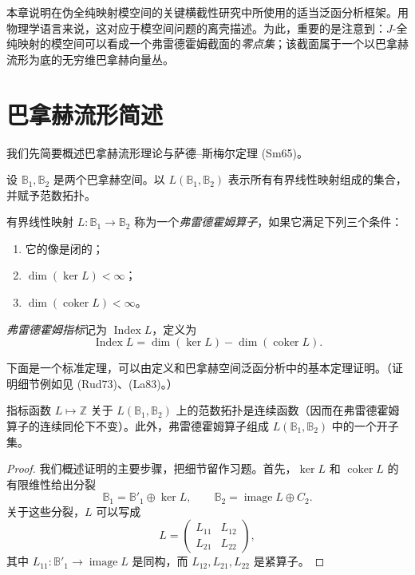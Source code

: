本章说明在伪全纯映射模空间的关键横截性研究中所使用的适当泛函分析框架。用物理学语言来说，这对应于模空间问题的离壳描述。为此，重要的是注意到：$J$-全纯映射的模空间可以看成一个弗雷德霍姆截面的\emph{零点集}；该截面属于一个以巴拿赫流形为底的无穷维巴拿赫向量丛。

\section{巴拿赫流形简述}
\label{sec:quick-review-banach-manifolds}

我们先简要概述巴拿赫流形理论与萨德--斯梅尔定理 (Sm65)。

设 $\mathbb B_1,\mathbb B_2$ 是两个巴拿赫空间。以
$L(\mathbb B_1,\mathbb B_2)$ 表示所有有界线性映射组成的集合，并赋予范数拓扑。

\begin{definition}\label{def:fredholm-operator}
有界线性映射 $L:\mathbb B_1\to\mathbb B_2$ 称为一个\emph{弗雷德霍姆算子}，如果它满足下列三个条件：
\begin{enumerate}[label=(\arabic*)]
 \item 它的像是闭的；
 \item $\dim(\ker L)<\infty$；
 \item $\dim(\operatorname{coker}L)<\infty$。
\end{enumerate}
\emph{弗雷德霍姆指标}记为 $\operatorname{Index}L$，定义为
\[
 \operatorname{Index}L=\dim(\ker L)-\dim(\operatorname{coker}L).
\]
\end{definition}

下面是一个标准定理，可以由定义和巴拿赫空间泛函分析中的基本定理证明。（证明细节例如见 (Rud73)、(La83)。）

\begin{proposition}\label{prop:index-continuity-fredholm-open}
指标函数 $L\mapsto\mathbb Z$ 关于 $L(\mathbb B_1,\mathbb B_2)$ 上的范数拓扑是连续函数（因而在弗雷德霍姆算子的连续同伦下不变）。此外，弗雷德霍姆算子组成 $L(\mathbb B_1,\mathbb B_2)$ 中的一个开子集。
\end{proposition}

\begin{proof}
我们概述证明的主要步骤，把细节留作习题。首先，$\ker L$ 和 $\operatorname{coker}L$ 的有限维性给出分裂
\[
 \mathbb B_1=\mathbb B'_1\oplus\ker L,
 \qquad
 \mathbb B_2=\operatorname{image}L\oplus C_2.
\]
关于这些分裂，$L$ 可以写成
\[
 L=
 \begin{pmatrix}
  L_{11}&L_{12}\\
  L_{21}&L_{22}
 \end{pmatrix},
\]
其中 $L_{11}:\mathbb B'_1\to\operatorname{image}L$ 是同构，而
$L_{12},L_{21},L_{22}$ 是紧算子。
\end{proof}

